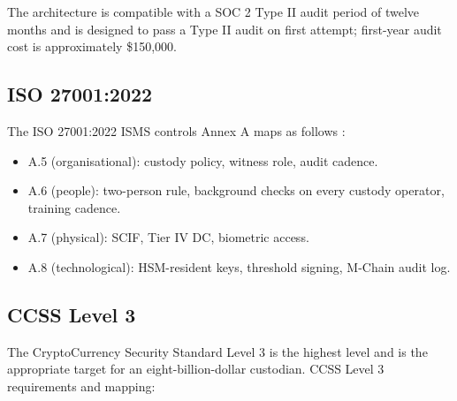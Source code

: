 The architecture is compatible with a SOC 2 Type II audit period of
twelve months and is designed to pass a Type II audit on first
attempt; first-year audit cost is approximately \$150{,}000.

\subsection{ISO 27001:2022}

The ISO 27001:2022 ISMS controls Annex A maps as follows
\cite{iso27001}:

\begin{itemize}[nosep]
\item A.5 (organisational): custody policy, witness role, audit
cadence.
\item A.6 (people): two-person rule, background checks on every
custody operator, training cadence.
\item A.7 (physical): SCIF, Tier IV DC, biometric access.
\item A.8 (technological): HSM-resident keys, threshold signing,
M-Chain audit log.
\end{itemize}

\subsection{CCSS Level 3}

The CryptoCurrency Security Standard \cite{ccss} Level 3 is the
highest level and is the appropriate target for an eight-billion-dollar
custodian. CCSS Level 3 requirements and mapping:

